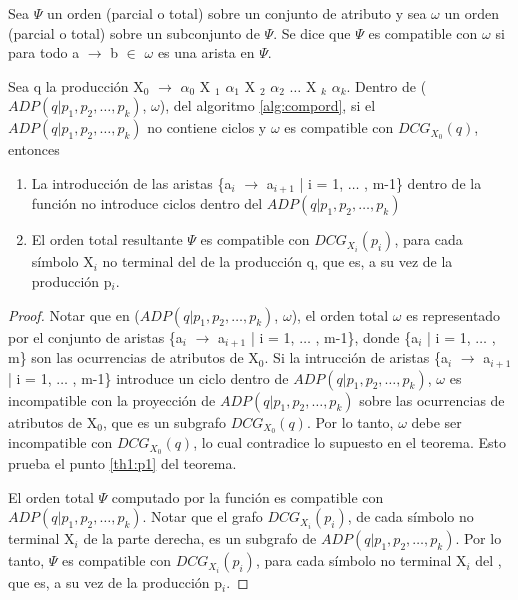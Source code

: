 \begin{definition}
Sea $\Psi$ un orden (parcial o total) sobre un conjunto de atributo y sea $\omega$ un orden (parcial o total) sobre un subconjunto de $\Psi$. Se dice que $\Psi$ es compatible con $\omega$ si para todo a $\rightarrow$ b $\in$ $\omega$ es una arista en $\Psi$.
\end{definition}


\begin{theorem}
\label{th1}
Sea q la producción X$_{0}$ $\rightarrow$ $\alpha_{0}$ X $_{1}$ $\alpha_{1}$ X $_{2}$ $\alpha_{2}$ $\ldots$ X $_{k}$ $\alpha_{k}$. Dentro de ($ADP (q | p_{1}, p_{2}, \dots, p_{k})$, $\omega$), del algoritmo \ref{alg:compord}, si el $ADP (q | p_{1}, p_{2}, \dots, p_{k})$ no contiene ciclos y $\omega$ es compatible con $DCG_{X_{0}}(q)$, entonces

\begin{enumerate}
    \item \label{th1:p1}La introducción de las aristas \{a$_{i}$ $\rightarrow$ a$_{i+1}$ | i = 1, $\ldots$ , m-1\} dentro de la función  no introduce ciclos dentro del $ADP (q | p_{1}, p_{2}, \dots, p_{k})$
 
    \item \label{th1:p2}El orden total resultante $\Psi$ es compatible con $DCG_{X_{i}}(p_{i})$, para cada símbolo X$_{i}$ no terminal del  de la producción q, que es, a su vez  de la producción p$_{i}$.
\end{enumerate}

\end{theorem}

\begin{proof}

Notar que en ($ADP (q | p_{1}, p_{2}, \dots, p_{k})$, $\omega$), el orden total $\omega$ es representado por el conjunto de aristas \{a$_{i}$ $\rightarrow$ a$_{i+1}$ | i = 1, $\ldots$ , m-1\}, donde \{a$_{i}$ | i = 1, $\ldots$ , m\} son las ocurrencias de atributos de X$_{0}$. Si la intrucción de aristas \{a$_{i}$ $\rightarrow$ a$_{i+1}$ | i = 1, $\ldots$ , m-1\} introduce un ciclo dentro de $ADP (q | p_{1}, p_{2}, \dots, p_{k})$, $\omega$ es incompatible con la proyección de $ADP (q | p_{1}, p_{2}, \dots, p_{k})$ sobre las ocurrencias de atributos de X$_{0}$, que es un subgrafo $DCG_{X_{0}}(q)$. Por lo tanto, $\omega$ debe ser incompatible con $DCG_{X_{0}}(q)$, lo cual contradice lo supuesto en el teorema. Esto prueba el punto \ref{th1:p1} del teorema.

El orden total $\Psi$ computado por la función  es compatible con $ADP (q | p_{1}, p_{2}, \dots, p_{k})$. Notar que el grafo $DCG_{X_{i}}(p_{i})$, de cada símbolo no terminal X$_{i}$ de la parte derecha, es un subgrafo de $ADP (q | p_{1}, p_{2}, \dots, p_{k})$. Por lo tanto, $\Psi$ es compatible con $DCG_{X_{i}}(p_{i})$, para cada símbolo no terminal X$_{i}$ del , que es, a su vez  de la producción p$_{i}$.

\end{proof}


